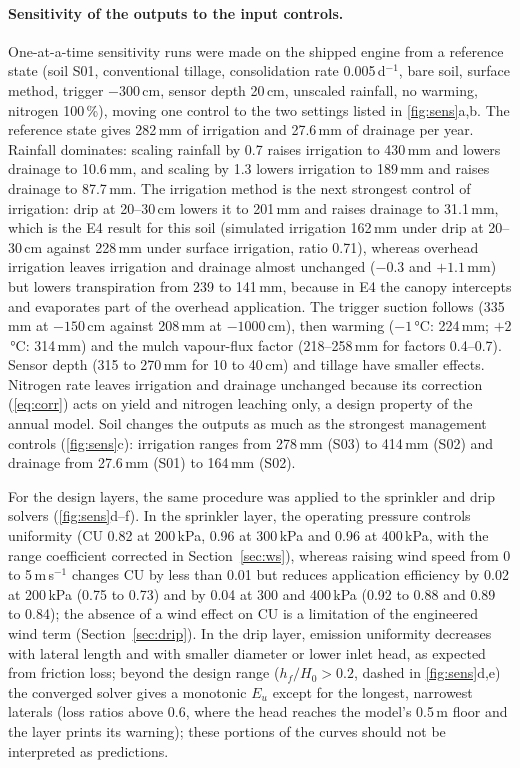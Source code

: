 \documentclass[preprint,12pt]{elsarticle}
\begin{document}
\paragraph{Sensitivity of the outputs to the input controls.}
\label{sec:sens}
One-at-a-time sensitivity runs were made on the shipped engine from a reference state (soil S01, conventional tillage, consolidation rate 0.005\,d$^{-1}$, bare soil, surface method, trigger $-300$\,cm, sensor depth 20\,cm, unscaled rainfall, no warming, nitrogen 100\,\%), moving one control to the two settings listed in \cref{fig:sens}a,b. The reference state gives 282\,mm of irrigation and 27.6\,mm of drainage per year. Rainfall dominates: scaling rainfall by 0.7 raises irrigation to 430\,mm and lowers drainage to 10.6\,mm, and scaling by 1.3 lowers irrigation to 189\,mm and raises drainage to 87.7\,mm. The irrigation method is the next strongest control of irrigation: drip at 20--30\,cm lowers it to 201\,mm and raises drainage to 31.1\,mm, which is the E4 result for this soil (simulated irrigation 162\,mm under drip at 20--30\,cm against 228\,mm under surface irrigation, ratio 0.71), whereas overhead irrigation leaves irrigation and drainage almost unchanged ($-0.3$ and $+1.1$\,mm) but lowers transpiration from 239 to 141\,mm, because in E4 the canopy intercepts and evaporates part of the overhead application. The trigger suction follows (335\,mm at $-150$\,cm against 208\,mm at $-1000$\,cm), then warming ($-1$\,°C: 224\,mm; $+2$\,°C: 314\,mm) and the mulch vapour-flux factor (218--258\,mm for factors 0.4--0.7). Sensor depth (315 to 270\,mm for 10 to 40\,cm) and tillage have smaller effects. Nitrogen rate leaves irrigation and drainage unchanged because its correction (\cref{eq:corr}) acts on yield and nitrogen leaching only, a design property of the annual model. Soil changes the outputs as much as the strongest management controls (\cref{fig:sens}c): irrigation ranges from 278\,mm (S03) to 414\,mm (S02) and drainage from 27.6\,mm (S01) to 164\,mm (S02).

For the design layers, the same procedure was applied to the sprinkler and drip solvers (\cref{fig:sens}d--f). In the sprinkler layer, the operating pressure controls uniformity (CU 0.82 at 200\,kPa, 0.96 at 300\,kPa and 0.96 at 400\,kPa, with the range coefficient corrected in Section~\ref{sec:ws}), whereas raising wind speed from 0 to 5\,m\,s$^{-1}$ changes CU by less than 0.01 but reduces application efficiency by 0.02 at 200\,kPa (0.75 to 0.73) and by 0.04 at 300 and 400\,kPa (0.92 to 0.88 and 0.89 to 0.84); the absence of a wind effect on CU is a limitation of the engineered wind term (Section~\ref{sec:drip}). In the drip layer, emission uniformity decreases with lateral length and with smaller diameter or lower inlet head, as expected from friction loss; beyond the design range ($h_f/H_0>0.2$, dashed in \cref{fig:sens}d,e) the converged solver gives a monotonic $E_u$ except for the longest, narrowest laterals (loss ratios above 0.6, where the head reaches the model's 0.5\,m floor and the layer prints its warning); these portions of the curves should not be interpreted as predictions.
\end{document}
